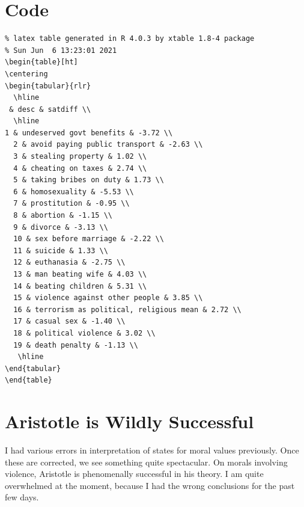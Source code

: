 \documentclass{amsart}
\begin{document}
\section{Code}

\begin{verbatim}
% latex table generated in R 4.0.3 by xtable 1.8-4 package
% Sun Jun  6 13:23:01 2021
\begin{table}[ht]
\centering
\begin{tabular}{rlr}
  \hline
 & desc & satdiff \\ 
  \hline
1 & undeserved govt benefits & -3.72 \\ 
  2 & avoid paying public transport & -2.63 \\ 
  3 & stealing property & 1.02 \\ 
  4 & cheating on taxes & 2.74 \\ 
  5 & taking bribes on duty & 1.73 \\ 
  6 & homosexuality & -5.53 \\ 
  7 & prostitution & -0.95 \\ 
  8 & abortion & -1.15 \\ 
  9 & divorce & -3.13 \\ 
  10 & sex before marriage & -2.22 \\ 
  11 & suicide & 1.33 \\ 
  12 & euthanasia & -2.75 \\ 
  13 & man beating wife & 4.03 \\ 
  14 & beating children & 5.31 \\ 
  15 & violence against other people & 3.85 \\ 
  16 & terrorism as political, religious mean & 2.72 \\ 
  17 & casual sex & -1.40 \\ 
  18 & political violence & 3.02 \\ 
  19 & death penalty & -1.13 \\ 
   \hline
\end{tabular}
\end{table}
\end{verbatim}

\section{Aristotle is Wildly Successful}

I had various errors in interpretation of states for moral values previously.  Once these are corrected, we see something quite spectacular.  On morals involving violence, Aristotle is phenomenally successful in his theory.  I am quite overwhelmed at the moment, because I had the wrong conclusions for the past few days.  
\end{document}
